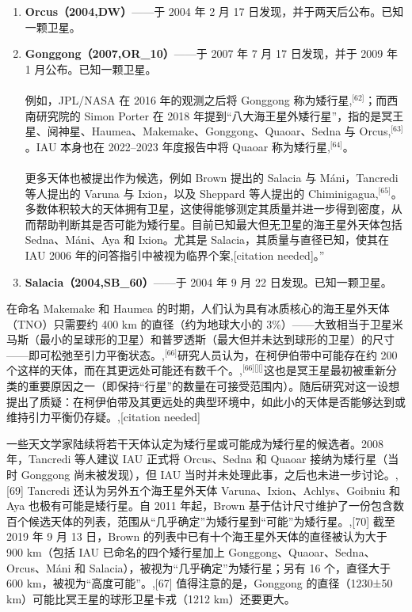 \begin{enumerate}
\item \textbf{Orcus（2004,DW）}——于 2004 年 2 月 17 日发现，并于两天后公布。已知一颗卫星。
\item \textbf{Gonggong（2007,OR_{10}）}——于 2007 年 7 月 17 日发现，并于 2009 年 1 月公布。已知一颗卫星。\\\\
例如，JPL/NASA 在 2016 年的观测之后将 Gonggong 称为矮行星,\(^\text{[62]}\)；而西南研究院的 Simon Porter 在 2018 年提到“八大海王星外矮行星”，指的是冥王星、阋神星、Haumea、Makemake、Gonggong、Quaoar、Sedna 与 Orcus,\(^\text{[63]}\)。IAU 本身也在 2022–2023 年度报告中将 Quaoar 称为矮行星,\(^\text{[64]}\)。\\\\
更多天体也被提出作为候选，例如 Brown 提出的 Salacia 与 Máni，Tancredi 等人提出的 Varuna 与 Ixion，以及 Sheppard 等人提出的 Chiminigagua,\(^\text{[65]}\)。多数体积较大的天体拥有卫星，这使得能够测定其质量并进一步得到密度，从而帮助判断其是否可能为矮行星。目前已知最大但无卫星的海王星外天体包括 Sedna、Máni、Aya 和 Ixion。尤其是 Salacia，其质量与直径已知，使其在 IAU 2006 年的问答指引中被视为临界个案,[citation needed]。”
\item \textbf{Salacia（2004,SB_{60}）}——于 2004 年 9 月 22 日发现。已知一颗卫星。
\end{enumerate}
在命名 Makemake 和 Haumea 的时期，人们认为具有冰质核心的海王星外天体（TNO）只需要约 400 km 的直径（约为地球大小的 3\%）——大致相当于卫星米马斯（最小的呈球形的卫星）和普罗透斯（最大但并未达到球形的卫星）的尺寸——即可松弛至引力平衡状态。,\(^\text{[66]}\)研究人员认为，在柯伊伯带中可能存在约 200 个这样的天体，而在其更远处可能还有数千个。,\(^\text{[66][][]}\)这也是冥王星最初被重新分类的重要原因之一（即保持“行星”的数量在可接受范围内）。随后研究对这一设想提出了质疑：在柯伊伯带及其更远处的典型环境中，如此小的天体是否能够达到或维持引力平衡仍存疑。,[citation needed]

一些天文学家陆续将若干天体认定为矮行星或可能成为矮行星的候选者。2008 年，Tancredi 等人建议 IAU 正式将 Orcus、Sedna 和 Quaoar 接纳为矮行星（当时 Gonggong 尚未被发现），但 IAU 当时并未处理此事，之后也未进一步讨论。,[69] Tancredi 还认为另外五个海王星外天体 Varuna、Ixion、Achlys、Goibniu 和 Aya 也极有可能是矮行星。自 2011 年起，Brown 基于估计尺寸维护了一份包含数百个候选天体的列表，范围从“几乎确定”为矮行星到“可能”为矮行星。,[70] 截至 2019 年 9 月 13 日，Brown 的列表中已有十个海王星外天体的直径被认为大于 900 km（包括 IAU 已命名的四个矮行星加上 Gonggong、Quaoar、Sedna、Orcus、Máni 和 Salacia），被视为“几乎确定”为矮行星；另有 16 个，直径大于 600 km，被视为“高度可能”。,[67] 值得注意的是，Gonggong 的直径（1230±50 km）可能比冥王星的球形卫星卡戎（1212 km）还要更大。

